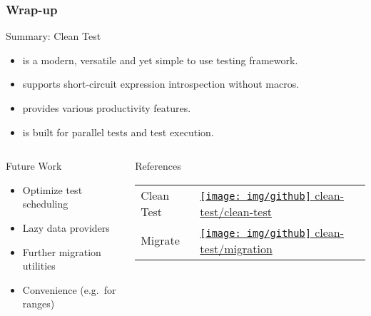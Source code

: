 \documentclass[10pt,aspectratio=169,utf8]{beamer}
\begin{document}
\begin{frame}
  \frametitle{Wrap-up}

  \vspace{8pt}
  \begin{exampleblock}{Summary: Clean Test}
    \begin{itemize}
      \item is a modern, versatile and yet simple to use testing framework.
      \item supports short-circuit expression introspection without macros.
      \item provides various productivity features.
      \item is built for parallel tests and test execution.
    \end{itemize}
  \end{exampleblock}

  \begin{columns}[onlytextwidth]
    \begin{column}{.48\textwidth}
      \begin{block}{Future Work}
        \parbox[c][.35\textheight][c]{\textwidth}{
          \begin{itemize}
            \item Optimize test scheduling
            \item Lazy data providers
            \item Further migration utilities
            \item Convenience (e.g.\ for ranges)
          \end{itemize}
        }
      \end{block}
    \end{column}

    \begin{column}{.48\textwidth}
      \begin{block}{References}
        \parbox[c][.35\textheight][c]{\textwidth}{
          \begin{tabular}{ @{}l l@{} }
            Clean Test &
            \href{%
              https://github.com/clean-test/clean-test
            }{%
              \texttt{[image: img/github]} clean-test/clean-test
            } \\

            Migrate&
            \href{%
              https://github.com/clean-test/migration
            }{%
              \texttt{[image: img/github]} clean-test/migration
            } \\


\end{tabular}}
\end{block}
\end{column}
\end{columns}
\end{frame}
\end{document}
